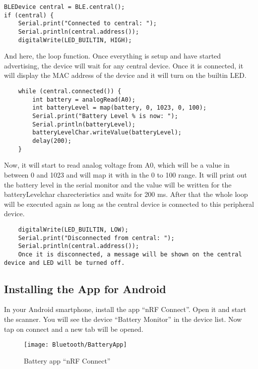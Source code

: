 \begin{lstlisting}
BLEDevice central = BLE.central();
if (central) {
    Serial.print("Connected to central: ");
    Serial.println(central.address());
    digitalWrite(LED_BUILTIN, HIGH);
\end{lstlisting}

And here, the loop function. Once everything is setup and have started advertising, the device will wait for any central device. Once it is connected, it will display the MAC address of the device and it will turn on the builtin LED.
    
\begin{lstlisting}
    while (central.connected()) {
        int battery = analogRead(A0);
        int batteryLevel = map(battery, 0, 1023, 0, 100);
        Serial.print("Battery Level % is now: ");
        Serial.println(batteryLevel);
        batteryLevelChar.writeValue(batteryLevel);
        delay(200);
    }
\end{lstlisting}

Now, it will start to read analog voltage from A0, which will be a value in between 0 and 1023 and will map it with in the 0 to 100 range. It will print out the battery level in the serial monitor and the value will be written for the batteryLevelchar charecteristics and waits for 200 ms. After that the whole loop will be executed again as long as the central device is connected to this peripheral device.
    
\begin{lstlisting}
    digitalWrite(LED_BUILTIN, LOW);
    Serial.print("Disconnected from central: ");
    Serial.println(central.address());
    Once it is disconnected, a message will be shown on the central device and LED will be turned off. 
\end{lstlisting}

\subsection{Installing the App for Android}

In your Android smartphone, install the app ``nRF Connect''. Open it and start the scanner. You will see the device ``Battery Monitor'' in the device list. Now tap on connect and a new tab will be opened. 

\begin{figure}
  \texttt{[image: Bluetooth/BatteryApp]}
  \caption{Battery app ``nRF Connect''}    
\end{figure}


